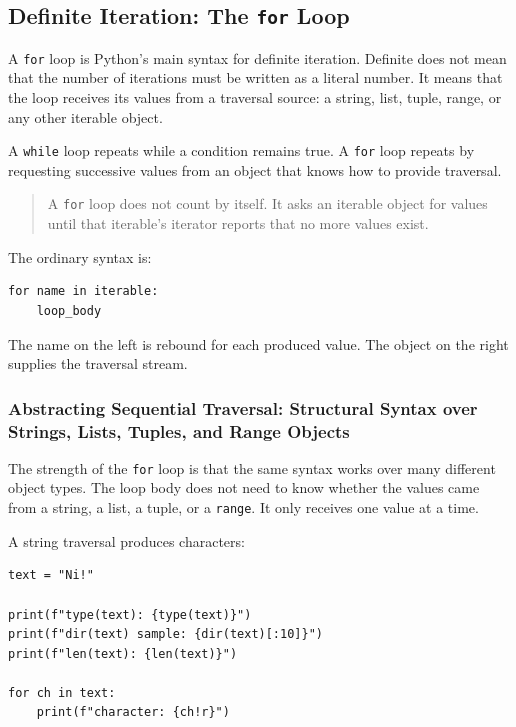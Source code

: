 \subsection{Definite Iteration: The \texttt{for} Loop}

A \texttt{for} loop is Python's main syntax for definite iteration. Definite does not mean that the number of iterations must be written as a literal number. It means that the loop receives its values from a traversal source: a string, list, tuple, range, or any other iterable object.

A \texttt{while} loop repeats while a condition remains true. A \texttt{for} loop repeats by requesting successive values from an object that knows how to provide traversal.

\begin{quote}
A \texttt{for} loop does not count by itself. It asks an iterable object for values until that iterable's iterator reports that no more values exist.
\end{quote}

The ordinary syntax is:

\begin{verbatim}
for name in iterable:
    loop_body
\end{verbatim}

The name on the left is rebound for each produced value. The object on the right supplies the traversal stream.

\subsubsection{Abstracting Sequential Traversal: Structural Syntax over Strings, Lists, Tuples, and Range Objects}

The strength of the \texttt{for} loop is that the same syntax works over many different object types. The loop body does not need to know whether the values came from a string, a list, a tuple, or a \texttt{range}. It only receives one value at a time.

A string traversal produces characters:

\begin{verbatim}
text = "Ni!"

print(f"type(text): {type(text)}")
print(f"dir(text) sample: {dir(text)[:10]}")
print(f"len(text): {len(text)}")

for ch in text:
    print(f"character: {ch!r}")
\end{verbatim}

